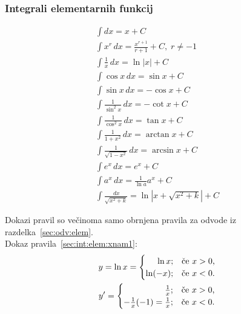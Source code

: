 \documentclass[a4paper,oneside,12pt,fleqn]{article}
\def\kos{\cos}
\renewcommand{\d}{\ensuremath{\,d}} %
\newcommand{\dx}{\ensuremath{\d x}}
\numberwithin{equation}{section}
\begin{document}
\subsubsection{Integrali elementarnih funkcij}
\label{sec:int:elem}
\begin{gather}
  \int\!\!dx = x + C \label{sec:int:elem:1} \\
  \int\!x^r\dx = \frac{x^{r+1}}{r+1} + C, \; r \neq -1 \label{sec:int:elem:xnan} \\
  \int\!\frac{1}{x}\dx = \ln|x| + C \label{sec:int:elem:xnam1} \\
  \int\!\kos x\dx = \sin x + C \label{sec:int:elem:cos} \\
  \int\!\sin x\dx = -\kos x + C \label{sec:int:elem:sin} \\
  \int\!\frac{1}{\sin^2x}\dx = -\cot x + C \label{sec:int:elem:1zsin2} \\
  \int\!\frac{1}{\kos^2x}\dx = \tan x + C \label{sec:int:elem:1zcos2} \\
  \int\!\frac{1}{1+x^2}\dx = \arctan x + C \label{sec:int:elem:1z1x2} \\
  \int\!\frac{1}{\sqrt{1-x^2}}\dx = \arcsin x + C \label{sec:int:elem:1zkor1mx2} \\
  \int\!e^x\dx = e^x + C \label{sec:int:elem:ex} \\
  \int\!a^x\dx = \frac{1}{\ln a}a^x + C \label{sec:int:elem:ax} \\
  \int\!\frac{\dx}{\sqrt{x^2+k}} = \ln|x+\sqrt{x^2+k}| + C \label{sec:int:elem:dolga}
\end{gather}

Dokazi pravil so večinoma samo obrnjena pravila za odvode iz
razdelka~\ref{sec:odv:elem}. \\
Dokaz pravila~\eqref{sec:int:elem:xnam1}:
\begin{gather*}
  y = \ln x =
  \begin{cases}
    \hfill    \ln x; & \text{če $x > 0$,} \\
    \hfill \ln (-x); & \text{če $x < 0$.}
  \end{cases} \\
  y' =
  \begin{cases}
    \hfill \frac{1}{x}; & \text{če $x > 0$,} \\
    \hfill -\frac{1}{x}(-1) = \frac{1}{x}; & \text{če $x < 0$.}
  \end{cases}
\end{gather*}
\end{document}
